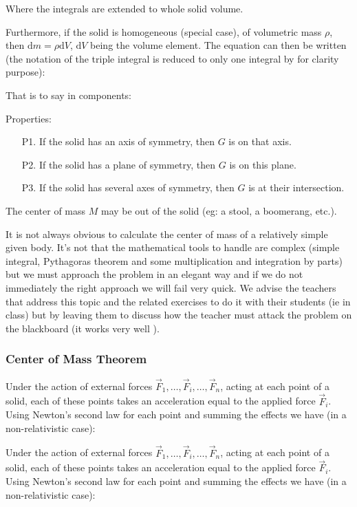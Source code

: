 	Where the integrals are extended to whole solid volume.
	
	Furthermore, if the solid is homogeneous (special case), of volumetric mass $\rho$, then $\mathrm{d}m=\rho\mathrm{d}V$, $\mathrm{d}V$ being the volume element. The equation can then be written (the notation of the triple integral is reduced to only one integral by for clarity purpose):
	
	That is to say in components:
	
	Properties:
	\begin{enumerate}
		\item[P1.] If the solid has an axis of symmetry, then $G$ is on that axis.

		\item[P2.] If the solid has a plane of symmetry, then $G$ is on this plane.

		\item[P3.] If the solid has several axes of symmetry, then $G$ is at their intersection.
	\end{enumerate}
	\begin{tcolorbox}[title=Remarks,colframe=black,arc=10pt]
	The center of mass $M$ may be out of the solid (eg: a stool, a boomerang, etc.).
	\end{tcolorbox}
	It is not always obvious to calculate the center of mass of a relatively simple given body. It's not that the mathematical tools to handle are complex (simple integral, Pythagoras theorem and some multiplication and integration by parts) but we must approach the problem in an elegant way and if we do not immediately the right approach we will fail very quick. We advise the teachers that address this topic and the related exercises to do it with their students (ie in class) but by leaving them to discuss how the teacher must attack the problem on the blackboard (it works very well ).
	

	\subsubsection{Center of Mass Theorem}
	Under the action of external forces $\vec{F}_1,\ldots,\vec{F}_i,\ldots,\vec{F}_n$, acting at each point of a solid, each of these points takes an acceleration equal to the applied force $\vec{F}_i$. Using Newton's second law for each point and summing the effects we have (in a non-relativistic case):
	
	Under the action of external forces $\vec{F}_1,\ldots,\vec{F}_i,\ldots,\vec{F}_n$, acting at each point of a solid, each of these points takes an acceleration equal to the applied force $\vec{F}_i$. Using Newton's second law for each point and summing the effects we have (in a non-relativistic case):
	
